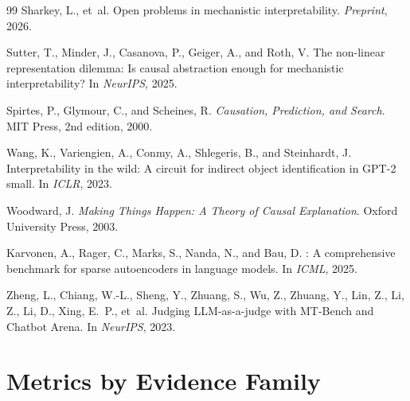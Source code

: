 \documentclass[10pt]{article}
\begin{document}
\begin{thebibliography}{99}
Sharkey, L., et~al.
\newblock Open problems in mechanistic interpretability.
\newblock \emph{Preprint}, 2026.

Sutter, T., Minder, J., Casanova, P., Geiger, A., and Roth, V.
\newblock The non-linear representation dilemma: Is causal abstraction enough for mechanistic interpretability?
\newblock In \emph{NeurIPS}, 2025.

Spirtes, P., Glymour, C., and Scheines, R.
\newblock \emph{Causation, Prediction, and Search}.
\newblock MIT Press, 2nd edition, 2000.

Wang, K., Variengien, A., Conmy, A., Shlegeris, B., and Steinhardt, J.
\newblock Interpretability in the wild: A circuit for indirect object identification in {GPT}-2 small.
\newblock In \emph{ICLR}, 2023.

Woodward, J.
\newblock \emph{Making Things Happen: A Theory of Causal Explanation}.
\newblock Oxford University Press, 2003.

Karvonen, A., Rager, C., Marks, S., Nanda, N., and Bau, D.
: A comprehensive benchmark for sparse autoencoders in language models.
\newblock In \emph{ICML}, 2025.

Zheng, L., Chiang, W.-L., Sheng, Y., Zhuang, S., Wu, Z., Zhuang, Y., Lin, Z., Li, Z., Li, D., Xing, E.~P., et~al.
\newblock Judging {LLM}-as-a-judge with {MT}-Bench and Chatbot Arena.
\newblock In \emph{NeurIPS}, 2023.

\end{thebibliography}

\appendix

\section{Metrics by Evidence Family}
\label{app:metrics}
\end{document}
